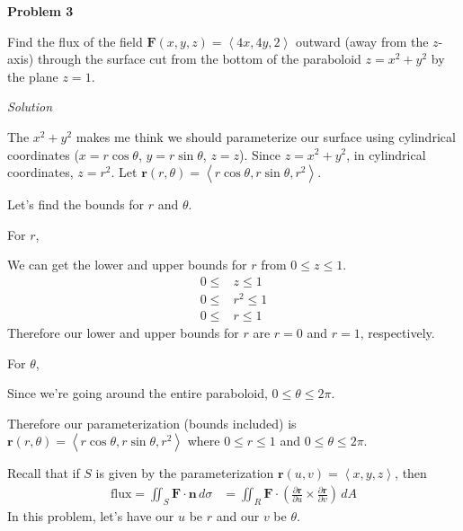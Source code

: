 \documentclass{article}
\newcommand{\lrp}[1]{\left( #1 \right)}
\newcommand{\lra}[1]{\left\langle #1 \right\rangle}
\renewcommand{\r}[0]{\mathbf{r}}
\newcommand{\F}[0]{\mathbf{F}}
\newcommand{\n}[0]{\mathbf{n}}
\newcommand{\Solution}{\textit{Solution}}
\begin{document}
{}\textbf{Problem 3}

Find the flux of the field $\F(x,y,z)=\lra{4x,4y,2}$ outward (away from the $z$-axis) through the surface cut from the bottom of the paraboloid $z=x^2+y^2$ by the plane $z=1$.

\Solution

The $x^2+y^2$ makes me think we should parameterize our surface using cylindrical coordinates ($x=r\cos\theta$, $y=r\sin\theta$, $z=z$). Since $z=x^2+y^2$, in cylindrical coordinates, $z=r^2$.  Let $\r(r,\theta)=\lra{r\cos\theta, r\sin\theta, r^2}$.

Let's find the bounds for $r$ and $\theta$.

For $r$,

We can get the lower and upper bounds for $r$ from $0\leq z\leq 1$.
\begin{align*}
    0\leq & z\leq 1\\
    0 \leq & r^2 \leq 1\tag{$z=r^2$}\\
    0 \leq & r\leq 1\tag{$r\geq 0$ always}
\end{align*}
Therefore our lower and upper bounds for $r$ are $r=0$ and $r=1$, respectively.

For $\theta$, 

Since we're going around the entire paraboloid, $0\leq \theta\leq 2\pi$.

Therefore our parameterization (bounds included) is $\r(r,\theta)=\lra{r\cos\theta, r\sin\theta, r^2}$ where $0\leq r\leq 1$ and $0\leq \theta\leq 2\pi$.

Recall that if $S$ is given by the parameterization $\r(u,v)=\lra{x,y,z}$, then
\begin{align*}
    \text{flux}=\iint_S \F\cdot \n \,d\sigma &= \iint_R \F \cdot \lrp{\frac{\partial \r}{\partial u}\times \frac{\partial \r}{\partial v}}\,dA
\end{align*}
In this problem, let's have our $u$ be $r$ and our $v$ be $\theta$.
\end{document}
